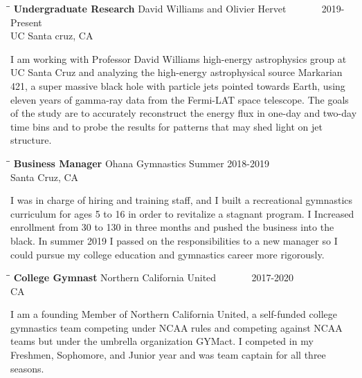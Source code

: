 \documentclass{res}
\begin{document}
\begin{resume}
\begin{tabbing}%
   \hspace{2.3in}\= \hspace{2.6in}\= \kill %
   {\bf Undergraduate Research}  \>David Williams and Olivier Hervet \> ~~~~~~ 2019-Present\\
                          \>UC Santa cruz, CA
   \end{tabbing}\vspace{-20pt}
   I am working with Professor David Williams high-energy astrophysics group at UC Santa Cruz and analyzing the high-energy astrophysical source Markarian 421, a super massive black hole with particle jets pointed towards Earth, using eleven years of gamma-ray data from the Fermi-LAT space telescope. The goals of the study are to accurately reconstruct the energy flux in one-day and two-day time bins and to probe the results for patterns that may shed light on jet structure.

   
   \begin{tabbing}
   \hspace{2.3in}\= \hspace{2.6in}\= \kill %
    {\bf Business Manager} \>Ohana Gymnastics     \>Summer 2018-2019\\
                             \>Santa Cruz, CA
   \end{tabbing}\vspace{-20pt}      %
    I was in charge of hiring and training staff, and I built a recreational gymnastics curriculum for ages 5 to 16 in order to revitalize a stagnant program. I Increased enrollment from 30 to 130 in three months and pushed the business into the black. In summer 2019 I passed on the responsibilities to a new manager so I could pursue my college education and gymnastics career more rigorously. 
    
   \begin{tabbing}
   \hspace{2.3in}\= \hspace{2.6in}\= \kill %
    {\bf College Gymnast} \>Northern California United \> ~~~~~~ 2017-2020\\
                          \>CA
   \end{tabbing}\vspace{-20pt}
    I am a founding Member of Northern California United, a self-funded college gymnastics team competing under NCAA rules and competing against NCAA teams but under the umbrella organization GYMact. I competed in my Freshmen, Sophomore, and  Junior year and was team captain for all three seasons.
    

\end{resume}
\end{document}
